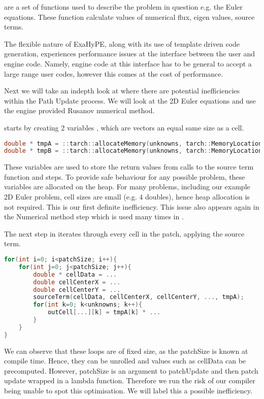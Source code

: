  are a set of functions used to describe the problem in question e.g. the Euler equations.
These function calculate values of numerical flux, eigen values, source terms.

The flexible nature of ExaHyPE, along with its use of template driven code generation, experiences performance issues at the interface between the user and engine code.
Namely, engine code at this interface has to be general to accept a large range user codes, however this comes at the cost of performance.


Next we will take an indepth look at where there are potential inefficiencies within the Path Update process.
We will look at the 2D Euler equations and use the engine provided Rusanov numerical method.


 starts by creating 2 variables ,  which are vectors an equal same size as a cell.

\begin{lstlisting}[language=c]
double * tmpA = ::tarch::allocateMemory(unknowns, tarch::MemoryLocation::Heap);
double * tmpB = ::tarch::allocateMemory(unknowns, tarch::MemoryLocation::Heap);
\end{lstlisting}

These variables are used to store the return values from calls to the source term function and  steps.
To provide safe behaviour for any possible problem, these variables are allocated on the heap.
For many problems, including our example 2D Euler problem, cell sizes are small (e.g. 4 doubles), hence heap allocation is not required. 
This is our first definite inefficiency.
This issue also appears again in the Numerical method step which is used many times in .

The next step in  iterates through every cell in the patch, applying the source term.
\begin{lstlisting}[language=c]
for(int i=0; i<patchSize; i++){
    for(int j=0; j<patchSize; j++){
        double * cellData = ...
        double cellCenterX = ...
        double cellCenterY = ...    
        sourceTerm(cellData, cellCenterX, cellCenterY, ..., tmpA);
        for(int k=0; k<unknowns; k++){
            outCell[...][k] = tmpA[k] * ...
        }
    }
}
\end{lstlisting}


We can observe that these loops are of fixed size, as the patchSize is known at compile time. 
Hence, they can be unrolled and values such as cellData can be precomputed.   
However, patchSize is an argument to patchUpdate and then patch update wrapped in a lambda function.
Therefore we run the risk of our compiler being unable to spot this optimisation.
We will label this a possible inefficiency.

